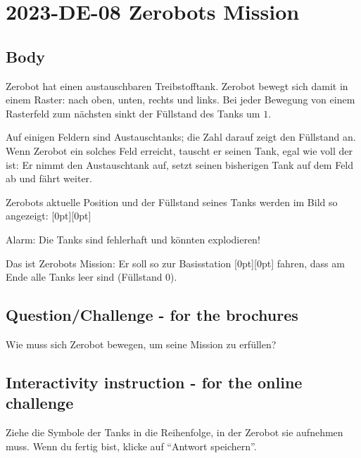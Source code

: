 \documentclass[a4paper,11pt]{report}
\newcommand{\taskGraphicsFolder}{..}
\begin{document}
\section*{\centering{} 2023-DE-08 Zerobots Mission}


\subsection*{Body}

Zerobot hat einen austauschbaren Treibstofftank.
Zerobot bewegt sich damit in einem Raster: nach oben, unten, rechts und links.
Bei jeder Bewegung von einem Rasterfeld zum nächsten sinkt der Füllstand des Tanks um $1$.

Auf einigen Feldern sind Austauschtanks; die Zahl darauf zeigt den Füllstand an.
Wenn Zerobot ein solches Feld erreicht, tauscht er seinen Tank, egal wie voll der ist:
Er nimmt den Austauschtank auf, setzt seinen bisherigen Tank auf dem Feld ab und fährt weiter.

Zerobots aktuelle Position und der Füllstand seines Tanks werden im Bild so angezeigt: \raisebox{-0.5ex}[0pt][0pt]{}

{\centering%
\par}

Alarm: Die Tanks sind fehlerhaft und könnten explodieren!

Das ist Zerobots Mission:
Er soll so zur Basisstation \raisebox{-0.5ex}[0pt][0pt]{} fahren, dass am Ende alle Tanks leer sind (Füllstand $0$).

{\em


\subsection*{Question/Challenge - for the brochures}

Wie muss sich Zerobot bewegen, um seine Mission zu erfüllen?

}


\subsection*{Interactivity instruction - for the online challenge}

Ziehe die Symbole der Tanks in die Reihenfolge, in der Zerobot sie aufnehmen muss. Wenn du fertig bist, klicke auf \enquote{Antwort speichern}.
\end{document}
